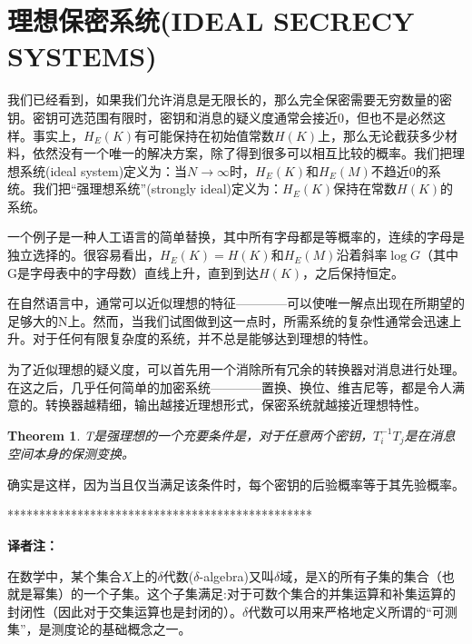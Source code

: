 \documentclass[]{article}
\newtheorem{theorem}{Theorem}
\begin{document}
\newpage
%   
%

\section{理想保密系统(IDEAL SECRECY SYSTEMS)}

我们已经看到，如果我们允许消息是无限长的，那么完全保密需要无穷数量的密钥。密钥可选范围有限时，密钥和消息的疑义度通常会接近0，但也不是必然这样。事实上，$H_E(K)$有可能保持在初始值常数$H(K)$上，那么无论截获多少材料，依然没有一个唯一的解决方案，除了得到很多可以相互比较的概率。我们把理想系统(ideal system)定义为：当$N\rightarrow \infty$时，$H_E(K)$和$H_E(M)$不趋近0的系统。我们把“强理想系统”(strongly ideal)定义为：$H_E(K)$保持在常数$H(K)$的系统。

一个例子是一种人工语言的简单替换，其中所有字母都是等概率的，连续的字母是独立选择的。很容易看出，$H_E(K)=H(K)$和$H_E(M)$沿着斜率$\log{G}$（其中G是字母表中的字母数）直线上升，直到到达$H(K)$，之后保持恒定。

在自然语言中，通常可以近似理想的特征————可以使唯一解点出现在所期望的足够大的N上。然而，当我们试图做到这一点时，所需系统的复杂性通常会迅速上升。对于任何有限复杂度的系统，并不总是能够达到理想的特性。

为了近似理想的疑义度，可以首先用一个消除所有冗余的转换器对消息进行处理。在这之后，几乎任何简单的加密系统————置换、换位、维吉尼等，都是令人满意的。转换器越精细，输出越接近理想形式，保密系统就越接近理想特性。

\begin{theorem}
	T是强理想的一个充要条件是，对于任意两个密钥，$T_i^{-1}T_j$是在消息空间本身的保测变换。
\end{theorem}

确实是这样，因为当且仅当满足该条件时，每个密钥的后验概率等于其先验概率。\par

\vspace{1cm}
************************************************\par
\textbf{译者注：}\par
在数学中，某个集合$X$上的$\delta$代数($\delta$-algebra)又叫$\delta$域，是X的所有子集的集合（也就是幂集）的一个子集。这个子集满足:对于可数个集合的并集运算和补集运算的封闭性（因此对于交集运算也是封闭的）。$\delta$代数可以用来严格地定义所谓的“可测集”，是测度论的基础概念之一。\par
\end{document}
